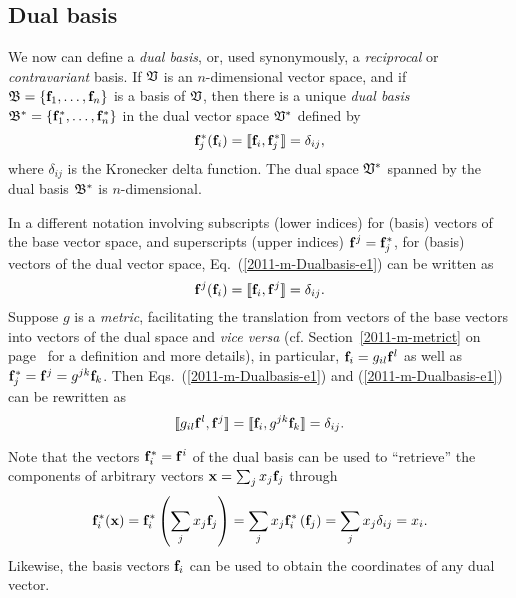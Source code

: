 \subsection{Dual basis}
\label{2011-m-Dualbasis}

We now can define a {\em dual basis}, or, used synonymously, a {\em reciprocal} or {\em contravariant} basis.
If ${\frak V}$ is an $n$-dimensional vector space, and if
${\frak B} = \{{\bf f}_1,\ldots , {\bf f}_n\}$
is a basis of  ${\frak V}$,
then there is a unique {\em dual basis}
${\frak B}^\ast
=\{{\bf f}_1^\ast ,\ldots , {\bf f}_n^\ast \}$ in the dual vector space ${\frak V}^\ast $
defined by
\begin{equation}
{\bf f}_j^\ast ({\bf f}_i) =  \llbracket {\bf f}_i,  {\bf f}_j^\ast \rrbracket =\delta_{ij},
\label{2011-m-Dualbasis-e1}
\end{equation}
where  $\delta_{ij}$
is the Kronecker delta function.
The dual space  ${\frak V}^\ast $ spanned by the dual basis ${\frak B}^\ast $ is $n$-dimensional.

In a different notation involving subscripts (lower indices) for (basis) vectors of the base vector space,
and superscripts (upper indices) ${\bf f}^j = {\bf f}_j^\ast $,
for (basis) vectors of the dual vector space,
Eq.~(\ref{2011-m-Dualbasis-e1}) can be written as
\begin{equation}
{\bf f}^j ( {\bf f}_i ) = \llbracket {\bf f}_i,{\bf f}^j\rrbracket =\delta_{ij}.
\label{2011-m-Dualbasis-e2}
\end{equation}
Suppose
$g$ is a {\em metric},
facilitating the translation from vectors of the base vectors into vectors of the dual space and {\it vice versa}
(cf. Section~\ref{2011-m-metrict} on page~\pageref{2011-m-metrict} for a definition and more details),
in particular, ${\bf f}_i =  g_{il}{\bf f}^l$
as well as  ${\bf f}_j^\ast  = {\bf f}^j = g^{jk}{\bf f}_k$.
Then Eqs.~(\ref{2011-m-Dualbasis-e1}) and (\ref{2011-m-Dualbasis-e1}) can be rewritten as
\begin{equation}
\llbracket g_{il} {\bf f}^l, {\bf f}^j\rrbracket     = \llbracket {\bf f}_i, g^{jk} {\bf f}_k\rrbracket   = \delta_{ij}.
\label{2011-m-Dualbasis-e3}
\end{equation}

Note that the vectors ${\bf f}^\ast_i = {\bf f}^i$ of the dual basis can be used to ``retrieve'' the components of arbitrary vectors
${\bf x} = \sum_j x_j {\bf f}_j$  through
\begin{equation}
{\bf f}^\ast_i ( {\bf x} ) =
{\bf f}^\ast_i \left( \sum_j x_j {\bf f}_j \right) =
\sum_j  x_j {\bf f}^\ast_i \left({\bf f}_j \right) =
\sum_j  x_j \delta_{ij} =
x_i.
\label{2016-m-fdlvs-recoverc}
\end{equation}
Likewise, the basis vectors ${\bf f}_i$ can be used to obtain the coordinates of any dual vector.



